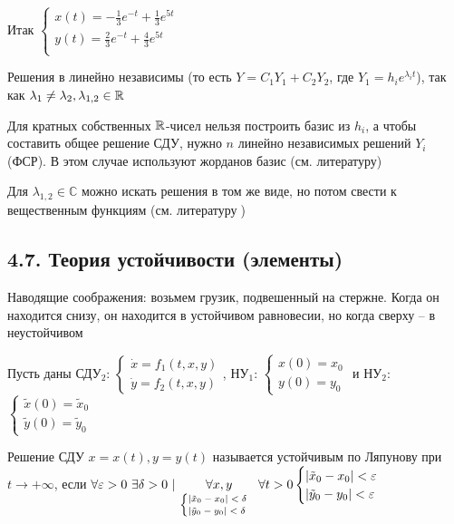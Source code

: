 \documentclass[12pt]{article}
\begin{document}
    Итак $\begin{cases}
              x(t) = -\frac{1}{3} e^{-t} + \frac{1}{3} e^{5t} \\
              y(t) = \frac{2}{3} e^{-t} + \frac{4}{3} e^{5t} \\
    \end{cases}$

    Решения в \Exs линейно независимы (то есть $Y = C_1 Y_1 + C_2 Y_2$, где $Y_1 = h_i e^{\lambda_i t}$), так как $\lambda_1 \neq \lambda_2, \lambda_{1,2} \in \mathbb{R}$

    Для кратных собственных $\mathbb{R}$-чисел нельзя построить базис из $h_i$, а чтобы составить общее решение СДУ,
    нужно $n$ линейно независимых решений $Y_i$ (ФСР). В этом случае используют жорданов базис (см. литературу)

    Для $\lambda_{1,2} \in \mathbb{C}$ можно искать решения в том же виде, но потом свести к вещественным функциям (см. литературу{\Large 🧐})

    \subsection{4.7. Теория устойчивости (элементы)}

    Наводящие соображения: возьмем грузик, подвешенный на стержне. Когда он находится снизу, он находится в устойчивом равновесии, но когда сверху -- в неустойчивом

    \Def Пусть даны СДУ$_2$:
    $\begin{cases}
        \dot x = f_1(t, x, y) \\
        \dot y = f_2(t, x, y)
    \end{cases}$, НУ$_1$:
    $\begin{cases}
        x(0) = x_0 \\
        y(0) = y_0
    \end{cases}$ и НУ$_2$:
    $\begin{cases}
        \tilde{x}(0) = \tilde{x}_0 \\
        \tilde{y}(0) = \tilde{y}_0
    \end{cases}$

    \hypertarget{stability}{}

    Решение СДУ $x = x(t), y = y(t)$ называется устойчивым по Ляпунову при $t \to +\infty$, если
    $\forall \varepsilon > 0 \ \exists \delta > 0 \ | \ \underset{ \scriptsize \begin{cases}|\tilde{x}_0 - x_0| < \delta \\ |\tilde{y}_0 - y_0| < \delta\end{cases}}{\forall x, y} \forall t > 0 \begin{cases}|\tilde{x}_0 - x_0| < \varepsilon \\ |\tilde{y}_0 - y_0| < \varepsilon\end{cases}$
\end{document}
